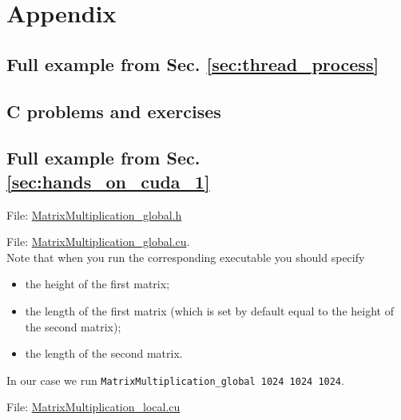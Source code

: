 \appendix

\chapter{Appendix}

\section{Full example from Sec. \ref{sec:thread_process}}\label{app:final_example}



\section{C problems and exercises}\label{app:C_exercises}

\section{Full example from Sec. \ref{sec:hands_on_cuda_1}}\label{app:matrix_example_cuda}

File: \underline{MatrixMultiplication\_global.h}



\hrulefill

File: \underline{MatrixMultiplication\_global.cu}. \\ Note that when you run the corresponding executable you should specify
\begin{itemize}
    \item[-] the height of the first matrix;
    \item[-] the length of the first matrix (which is set by default equal to the height of the second matrix);
    \item[-] the length of the second matrix.
\end{itemize}
In our case we run \texttt{MatrixMultiplication\_global 1024 1024 1024}.



\hrulefill

File: \underline{MatrixMultiplication\_local.cu}

